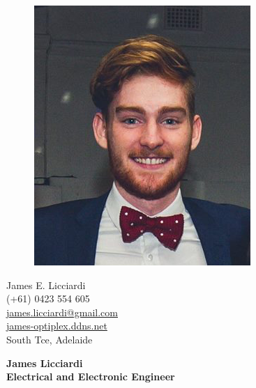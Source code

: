 \documentclass[a4paper,12pt,final]{memoir}
\begin{document}
\begin{figure}
	\hfill
	\includegraphics[width=1\columnwidth]{resume_photo.png}
	\vspace{-7cm}
\end{figure}

\begin{flushright}\small
	James E. Licciardi \\
	(+61) 0423 554 605 \\
	\tiny{\url{james.licciardi@gmail.com}}  \\
	\tiny{\url{james-optiplex.ddns.net}} \\
	South Tce, Adelaide

\end{flushright}\normalsize
\framebreak


\Huge\bfseries {\color{Maroon} James Licciardi} \\
\Large\bfseries  Electrical and Electronic Engineer \\

\normalsize\normalfont
\end{document}
